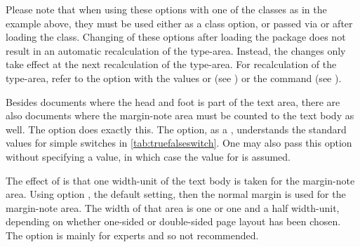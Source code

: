 Please note that when using these options with one of the
{\KOMAScript} classes as in the example above, they must be used
either as a class option, or passed via  or
 after loading the class. Changing of these options
after loading the  package does not result in an
automatic recalculation of the type-area. Instead, the changes only
take effect at the next recalculation of the type-area. For
recalculation of the type-area, refer to the  option with
the values  or  (see
) or the
 command (see
).%
%
%
%


%
\begin{Declaration}
\end{Declaration}
Besides documents where the head and foot is part of the
text area, there are also documents where the margin-note area must be
counted to the text body as well.  The option  does
exactly this.  The option, as a
, understands the
standard values for simple switches in
\autoref{tab:truefalseswitch}. One may also pass this option without
specifying a value, in which case the value  for
 is assumed.

The effect of  is that one width-unit of
the text body is taken for the margin-note area.  Using option
, the default setting, then the normal
margin is used for the margin-note area.  The width of that area is
one or one and a half width-unit, depending on whether one-sided or
double-sided page layout has been chosen.  The option
 is mainly for experts and so not recommended.
  
